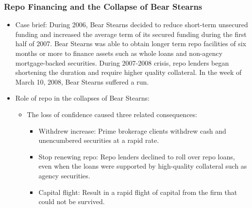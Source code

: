 \subsubsection{Repo Financing and the Collapse of Bear Stearns}
\begin{itemize}
\item Case brief: During 2006, Bear Stearns decided to reduce short-term unsecured funding and increased the average term of its secured funding during the first half of 2007. Bear Stearns was able to obtain longer term repo facilities of six months or more to finance assets such as whole loans and non-agency mortgage-backed securities. During 2007-2008 crisis, repo lenders began shortening the duration and require higher quality collateral. In the week of March 10, 2008, Bear Stearns suffered a run.
\item Role of repo in the collapses of Bear Stearns:
    \begin{itemize}
    \item The loss of confidence caused three related consequences:
        \begin{itemize}
        \item Withdrew increase: Prime brokerage clients withdrew cash and unencumbered securities at a rapid rate.
        \item Stop renewing repo: Repo lenders declined to roll over repo loans, even when the loans were supported by high-quality collateral such as agency securities.
        \item Capital flight: Result in a rapid flight of capital from the firm that could not be survived.
        \end{itemize}
    \end{itemize}
\end{itemize}




